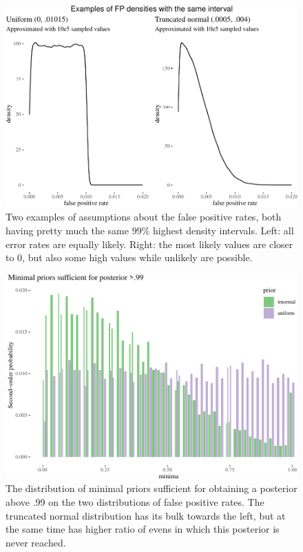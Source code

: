 \documentclass[
  10pt,
  dvipsnames,enabledeprecatedfontcommands]{scrartcl}
\begin{document}
\begin{figure}[H]



\begin{center}\includegraphics[width=0.8\linewidth]{chapter-outline_files/figure-latex/fig:fppdistros-1} \end{center}


\caption{Two examples of assumptions about the false positive rates, both having pretty much the same 99\% highest density intervals. Left: all error rates are equally likely. Right: the most likely values are closer to 0, but also some high values while unlikely are possible.}

\label{fig:fppdistros}

\end{figure}

\begin{figure}[H]



\begin{center}\includegraphics[width=0.8\linewidth]{chapter-outline_files/figure-latex/fig:fppMinima-1} \end{center}


\caption{The distribution of minimal priors sufficient for obtaining a posterior above .99 on the two distributions of false positive rates. The truncated normal distribution has its bulk towards the left, but at the same time has higher ratio of evens in which this posterior is never reached. }

\label{fig:fppMinima}

\end{figure}
\end{document}
